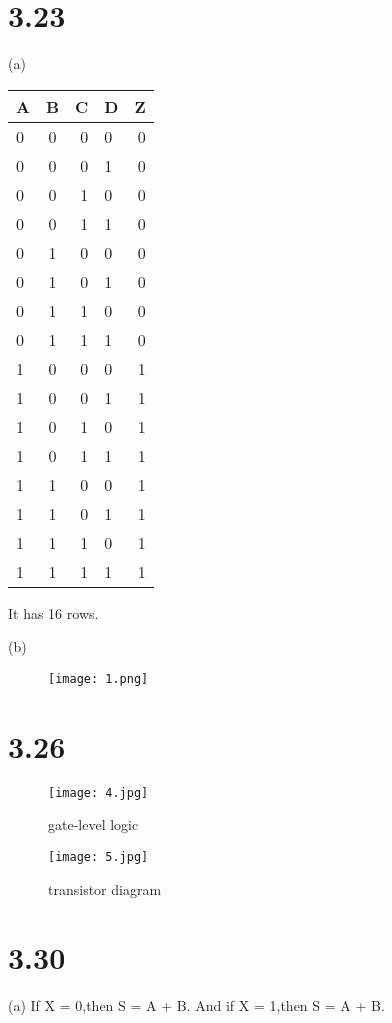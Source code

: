 \documentclass[20pt]{ctexart}
\begin{document}
\section*{3.23}
(a)\begin{table}[H]
\centering
\begin{tabular}{lcr|lr}
    \hline
    A & B & C & D & Z \\
    \hline
    0 & 0 & 0 & 0 & 0 \\
    0 & 0 & 0 & 1 & 0 \\
    0 & 0 & 1 & 0 & 0 \\
    0 & 0 & 1 & 1 & 0 \\
    0 & 1 & 0 & 0 & 0 \\
    0 & 1 & 0 & 1 & 0 \\
    0 & 1 & 1 & 0 & 0 \\
    0 & 1 & 1 & 1 & 0 \\
    1 & 0 & 0 & 0 & 1 \\
    1 & 0 & 0 & 1 & 1 \\
    1 & 0 & 1 & 0 & 1 \\
    1 & 0 & 1 & 1 & 1 \\
    1 & 1 & 0 & 0 & 1 \\
    1 & 1 & 0 & 1 & 1 \\
    1 & 1 & 1 & 0 & 1 \\
    1 & 1 & 1 & 1 & 1 \\
    \hline
    \end{tabular}
    \end{table}

It has 16 rows.

(b) \begin{figure}[H]
    \centering
    \texttt{[image: 1.png]}
  \end{figure}

\section*{3.26}
\begin{figure}[H]
    \centering
    \texttt{[image: 4.jpg]}
    \caption*{gate-level logic}
  \end{figure}

\begin{figure}[H]
    \centering
    \texttt{[image: 5.jpg]}
    \caption*{transistor diagram}
  \end{figure}
\section*{3.30}
(a) If X = 0,then S = A + B. And if X = 1,then S = A + B.
\end{document}
